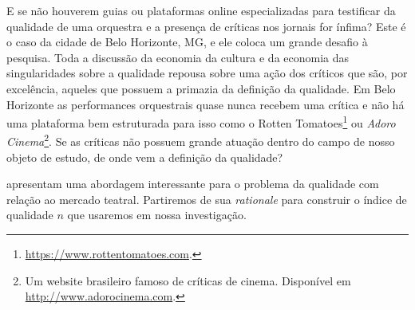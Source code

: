 \documentclass[a4paper, 12pt, openright, oneside, german, french, english, brazil]{abntex2}
\begin{document}
	
	E se não houverem guias ou plataformas online especializadas para testificar da qualidade de uma orquestra e a presença de críticas nos jornais for ínfima? Este é o caso da cidade de Belo Horizonte, MG, e ele coloca um grande desafio à pesquisa. Toda a discussão da economia da cultura e da economia das singularidades sobre a qualidade repousa sobre uma ação dos críticos que são, por excelência, aqueles que possuem a primazia da definição da qualidade. Em Belo Horizonte as performances orquestrais quase nunca recebem uma crítica e não há uma plataforma bem estruturada para isso como o Rotten Tomatoes\footnote{\url{https://www.rottentomatoes.com}.} ou \textit{Adoro Cinema}\footnote{Um website brasileiro famoso de críticas de cinema. Disponível em \url{http://www.adorocinema.com}.}. Se as críticas não possuem grande atuação dentro do campo de nosso objeto de estudo, de onde vem a definição da qualidade?
	
	
	 apresentam uma abordagem interessante para o problema da qualidade com relação ao mercado teatral. Partiremos de sua \textit{rationale} para construir o índice de qualidade $n$ que usaremos em nossa investigação.
	
	
\end{document}
